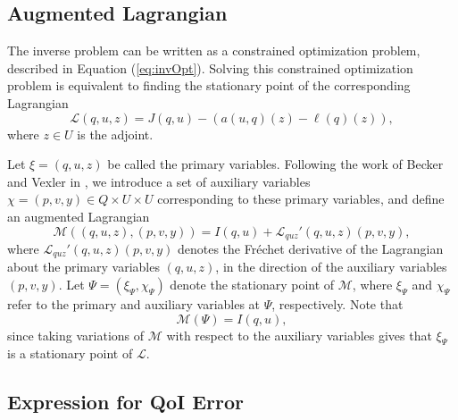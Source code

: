 \subsection{Augmented Lagrangian} \label{sec:augLag}

The inverse problem can be written as a constrained optimization problem, described in Equation (\ref{eq:invOpt}). Solving this constrained optimization problem is equivalent to finding the stationary point of the corresponding Lagrangian
\begin{equation}
\mathcal{L}(q,u,z)= J(q,u)-(a(u,q)(z)-\ell(q)(z)),
\end{equation}
where $z\in U$ is the adjoint.

Let $\xi=(q,u,z)$ be called the primary variables. Following the work of Becker and Vexler in \cite{BecVex05}, we introduce a set of auxiliary variables $\chi=(p,v,y)\in Q\times U\times U$ corresponding to these primary variables, and define an augmented Lagrangian
\begin{equation}
\mathcal{M}((q,u,z),(p,v,y)) = I(q,u) + \mathcal{L}_{quz}'(q,u,z)(p,v,y),
\end{equation}
where $\mathcal{L}_{quz}'(q,u,z)(p,v,y)$ denotes the Fr\'{e}chet derivative of the Lagrangian about the primary variables $(q,u,z)$, in the direction of the auxiliary variables $(p,v,y)$. Let $\Psi = (\xi_\Psi,\chi_\Psi)$ denote the stationary point of $\mathcal{M}$, where $\xi_\Psi$ and $\chi_\Psi$ refer to the primary and auxiliary variables at $\Psi$, respectively. Note that
\begin{equation}
\mathcal{M}(\Psi)=I(q,u),
\label{eq:MeqI}
\end{equation} since taking variations of $\mathcal{M}$ with respect to the auxiliary variables gives that $\xi_\Psi$ is a stationary point of $\mathcal{L}$.

\subsection{Expression for QoI Error} \label{sec:btwnMandadj}

